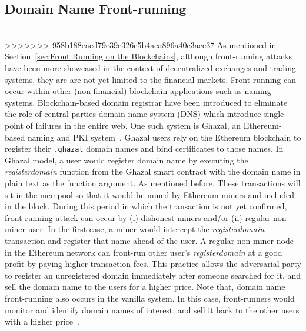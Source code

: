 \subsection{Domain Name Front-running} \hfill\\    %
>>>>>>> 958b188eacd79e39e326c5b4aea896a40e3ace37
\noindent As mentioned in Section~\ref{sec:Front Running on the Blockchains}, although front-running attacks have been more showcased in the context of decentralized exchanges and trading systems, they are are not yet limited to the financial markets. Front-running can occur within other (non-financial) blockchain applications such as naming systems. Blockchain-based domain registrar have been introduced to eliminate the role of central parties \ie domain name system (DNS) which introduce single point of failures in the entire web. One such system is Ghazal, an Ethereum-based naming and PKI system~\cite{moosavighazal}. Ghazal users rely on the Ethereum blockchain to register their \texttt{.ghazal} domain names and bind certificates to those names. In Ghazal model, a user would register domain name by executing the \textit{registerdomain} function from the Ghazal smart contract with the domain name in plain text as the function argument. As mentioned before, These transactions will sit in the mempool so that it would be mined by Ethereum miners and included in the block. During this period in which the transaction is not yet confirmed, front-running attack can occur by (i) dishonest miners and/or (ii) regular non-miner user. In the first case, a miner would intercept the \textit{registerdomain} transaction and register that name ahead of the user. A regular non-miner node in the Ethereum network can front-run other user's \textit{registerdomain} at a good profit by paying higher transaction fees. This practice allows the adversarial party  to register an unregistered domain immediately after someone searched for it, and sell the domain name to the users for a higher price. Note that, domain name front-running also occurs in the vanilla system. In this case, front-runners would monitor and identify domain names of interest, and sell it back to the other users with a higher price~\cite{sac022en33:online}.





